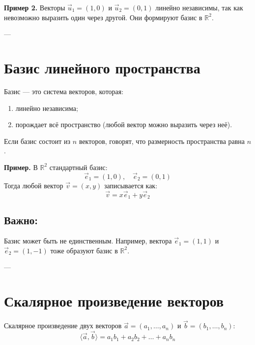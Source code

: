 \textbf{Пример 2.}
Векторы $\vec{u}_1 = (1, 0)$ и $\vec{u}_2 = (0, 1)$ линейно независимы, так как невозможно выразить один через другой. Они формируют базис в $\mathbb{R}^2$.

---

\section{Базис линейного пространства}

Базис — это система векторов, которая:
\begin{enumerate}
  \item линейно независима;
  \item порождает всё пространство (любой вектор можно выразить через неё).
\end{enumerate}

Если базис состоит из $n$ векторов, говорят, что размерность пространства равна $n$.

\textbf{Пример.} В $\mathbb{R}^2$ стандартный базис:
\[
\vec{e}_1 = (1, 0), \quad \vec{e}_2 = (0, 1)
\]
Тогда любой вектор $\vec{v} = (x, y)$ записывается как:
\[
\vec{v} = x \vec{e}_1 + y \vec{e}_2
\]

\vspace{1em}
\begin{center}
\end{center}

\subsection*{Важно:}
Базис может быть не единственным. Например, вектора $\vec{e}_1 = (1, 1)$ и $\vec{e}_2 = (1, -1)$ тоже образуют базис в $\mathbb{R}^2$.

---

\section{Скалярное произведение векторов}

Скалярное произведение двух векторов $\vec{a} = (a_1, \dots, a_n)$ и $\vec{b} = (b_1, \dots, b_n)$:
\[
\langle \vec{a}, \vec{b} \rangle = a_1b_1 + a_2b_2 + \dots + a_n b_n
\]

